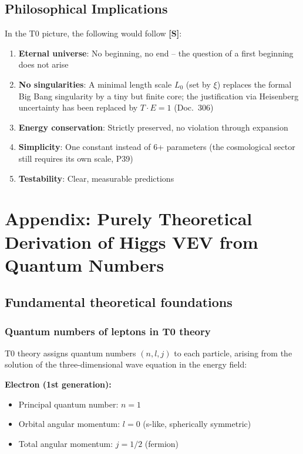 \subsection{Philosophical Implications}
\label{subsec:philosophical_implications}

In the T0 picture, the following would follow \textbf{[S]}:
\begin{enumerate}
	\item \textbf{Eternal universe}: No beginning, no end -- the question of a first beginning does not arise
	\item \textbf{No singularities}: A minimal length scale $L_0$ (set by $\xi$) replaces the formal Big Bang singularity by a tiny but finite core; the justification via Heisenberg uncertainty has been replaced by $T\cdot E = 1$ (Doc.~306)
	\item \textbf{Energy conservation}: Strictly preserved, no violation through expansion
	\item \textbf{Simplicity}: One constant instead of 6+ parameters (the cosmological sector still requires its own scale, P39)
	\item \textbf{Testability}: Clear, measurable predictions
\end{enumerate}
\section{Appendix: Purely Theoretical Derivation of Higgs VEV from Quantum Numbers}

\subsection{Fundamental theoretical foundations}

\subsubsection{Quantum numbers of leptons in T0 theory}

T0 theory assigns quantum numbers $(n, l, j)$ to each particle, arising from the solution of the three-dimensional wave equation in the energy field:

\textbf{Electron (1st generation):}
\begin{itemize}
	\item Principal quantum number: $n = 1$
	\item Orbital angular momentum: $l = 0$ (s-like, spherically symmetric)
	\item Total angular momentum: $j = 1/2$ (fermion)
\end{itemize}

